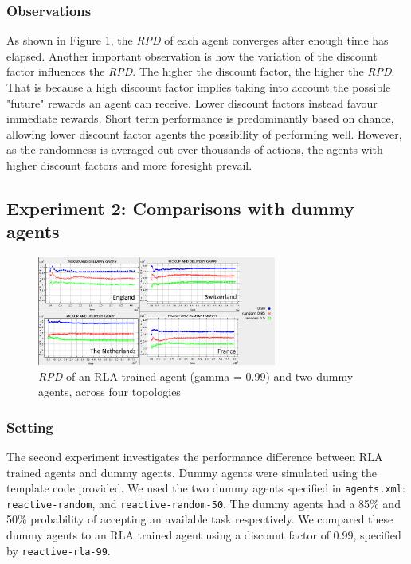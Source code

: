 \documentclass[11pt]{article}
\begin{document}
\subsubsection{Observations}
As shown in Figure 1, the \textit{RPD} of each agent converges after enough time has elapsed. Another important observation is how the variation of the discount factor influences the \textit{RPD}. The higher the discount factor, the higher the \textit{RPD}. That is because a high discount factor implies taking into account the possible "future" rewards an agent can receive. Lower discount factors instead favour immediate rewards. Short term performance is predominantly based on chance, allowing lower discount factor agents the possibility of performing well. However, as the randomness is averaged out over thousands of actions, the agents with higher discount factors and more foresight prevail.\\

\subsection{Experiment 2: Comparisons with dummy agents}
\begin{figure}
	\centering
	\includegraphics[width=0.7\textwidth]{ex2}
	\caption{\textit{RPD} of an RLA trained agent (gamma = 0.99) and two dummy agents, across four topologies}
	\label{figure:1}
\end{figure}
\subsubsection{Setting}
The second experiment investigates the performance difference between RLA trained agents and dummy agents. Dummy agents were simulated using the template code provided. We used the two dummy agents specified in \texttt{agents.xml}: \texttt{reactive-random}, and \texttt{reactive-random-50}. The dummy agents had a 85\% and 50\% probability of accepting an available task respectively. We compared these dummy agents to an RLA trained agent using a discount factor of 0.99, specified by \texttt{reactive-rla-99}.\\
\\
\\
\end{document}
